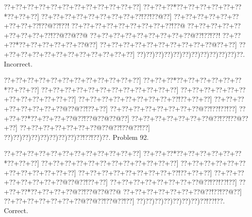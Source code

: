 \documentclass[a5paper]{article}
\begin{document}
\begin{center}
{\goo
\0??+\0??+\0??+\0??+\0??+\0??+\0??+\0??+\0??+\0??+\0??+\0??]
\0??+\0??+\0??*\0??+\0??+\0??+\0??+\0??+\0??*\0??+\0??+\0??]
\0??+\0??+\0??+\0??+\0??+\0??+\0??+\0??+\0??!\0??!\0??@\0??]
\0??+\0??+\0??+\0??+\0??+\0??+\0??+\0??+\0??!\0??@\0??!\0??!
\0??+\0??+\0??+\0??+\0??+\0??+\0??+\0??+\0??!\0??@
\0??+\0??+\0??+\0??+\0??+\0??+\0??+\0??+\0??!\0??@\0??@\0??@
\0??+\0??+\0??+\0??+\0??+\0??+\0??+\0??+\0??@\0??!\0??!\0??!
\0??+\0??+\0??*\0??+\0??+\0??+\0??+\0??+\0??@\0??]
\0??+\0??+\0??+\0??+\0??+\0??+\0??+\0??+\0??+\0??@\0??+\0??]
\0??+\0??+\0??+\0??+\0??+\0??+\0??+\0??+\0??+\0??+\0??+\0??]
\0??)\0??)\0??)\0??)\0??)\0??)\0??)\0??)\0??)\0??)\0??)\0??.
}
Incorrect. 

\end{center}
\newpage
\begin{center}
{\goo
\0??+\0??+\0??+\0??+\0??+\0??+\0??+\0??+\0??+\0??+\0??+\0??]
\0??+\0??+\0??*\0??+\0??+\0??+\0??+\0??+\0??*\0??+\0??+\0??]
\0??+\0??+\0??+\0??+\0??+\0??+\0??+\0??+\0??+\0??+\0??+\0??]
\0??+\0??+\0??+\0??+\0??+\0??+\0??+\0??+\0??+\0??+\0??+\0??]
\0??+\0??+\0??+\0??+\0??+\0??+\0??+\0??+\0??!\0??+\0??+\0??]
\0??+\0??+\0??+\0??+\0??+\0??+\0??+\0??@\0??@\0??!\0??+\0??]
\0??+\0??+\0??+\0??+\0??+\0??+\0??+\0??@\0??!\0??!\0??!\0??]
\0??+\0??+\0??*\0??+\0??+\0??+\0??@\0??!\0??@\0??@\0??@\0??]
\0??+\0??+\0??+\0??+\0??+\0??+\0??@\0??!\0??!\0??@\0??+\0??]
\0??+\0??+\0??+\0??+\0??+\0??+\0??@\0??@\0??!\0??@\0??!\0??]
\0??)\0??)\0??)\0??)\0??)\0??)\0??)\0??)\0??!\0??!\0??)\0??.
}
Problem 92.

\end{center}
\begin{center}
{\goo
\0??+\0??+\0??+\0??+\0??+\0??+\0??+\0??+\0??+\0??+\0??+\0??]
\0??+\0??+\0??*\0??+\0??+\0??+\0??+\0??+\0??*\0??+\0??+\0??]
\0??+\0??+\0??+\0??+\0??+\0??+\0??+\0??+\0??+\0??+\0??+\0??]
\0??+\0??+\0??+\0??+\0??+\0??+\0??+\0??+\0??+\0??+\0??+\0??]
\0??+\0??+\0??+\0??+\0??+\0??+\0??+\0??+\0??!\0??+\0??+\0??]
\0??+\0??+\0??+\0??+\0??+\0??+\0??+\0??@\0??@\0??!\0??+\0??]
\0??+\0??+\0??+\0??+\0??+\0??+\0??+\0??@\0??!\0??!\0??!\0??]
\0??+\0??+\0??*\0??+\0??+\0??+\0??@\0??!\0??@\0??@\0??@
\0??+\0??+\0??+\0??+\0??+\0??+\0??@\0??!\0??!\0??@\0??]
\0??+\0??+\0??+\0??+\0??+\0??+\0??@\0??@\0??!\0??@\0??!\0??]
\0??)\0??)\0??)\0??)\0??)\0??)\0??)\0??!\0??!\0??.
}
Correct. 

\end{center}
\end{document}
